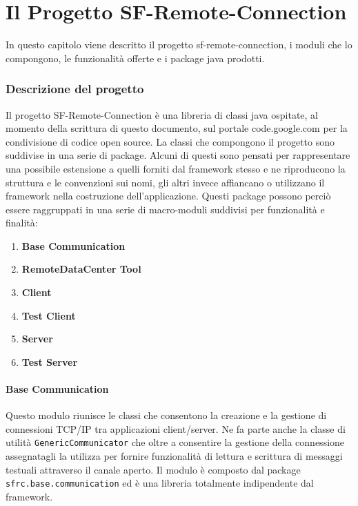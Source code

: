 
\chapter{Il Progetto SF-Remote-Connection}
\label{ch:sfremoteconnection}
In questo capitolo viene descritto il progetto sf-remote-connection, i moduli che lo compongono, le funzionalità offerte e i package java prodotti.

\subsection{Descrizione del progetto} 
\label{sub:descrizione}
Il progetto SF-Remote-Connection è una libreria di classi java ospitate, al momento della scrittura di questo documento, sul portale %
code.google.com per la condivisione di codice open source.
La classi che compongono il progetto sono suddivise in una serie di package. %
Alcuni di questi sono pensati per rappresentare una possibile estensione a quelli forniti dal framework stesso e ne riproducono la struttura e le convenzioni sui nomi, gli altri invece affiancano o utilizzano il framework nella costruzione dell'applicazione.
Questi package possono perciò essere raggruppati in una serie di macro-moduli suddivisi per funzionalità e finalità:
\begin{enumerate}
	\item \textbf{Base Communication}
	\item \textbf{RemoteDataCenter Tool}
	\item \textbf{Client}
	\item \textbf{Test Client}
	\item \textbf{Server}         
	\item \textbf{Test Server}
\end{enumerate}

\subsubsection{Base Communication}
\label{subsub:basecommodule}
Questo modulo riunisce le classi che consentono la creazione e la gestione di connessioni TCP/IP tra applicazioni client/server. Ne fa parte anche la classe di utilità \texttt{GenericCommunicator} che oltre a consentire la gestione della connessione assegnatagli la utilizza per fornire funzionalità di lettura e scrittura di messaggi testuali attraverso il canale aperto.
Il modulo è composto dal package \texttt{sfrc.base.communication} ed è una libreria totalmente indipendente dal framework.

